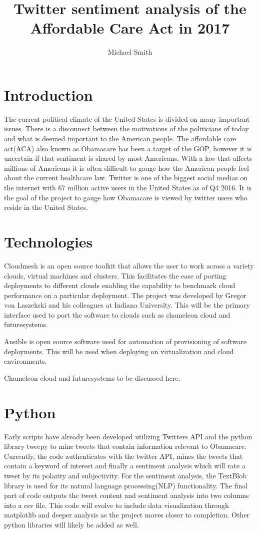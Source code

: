 \documentclass[9pt,twocolumn,twoside]{../../styles/osajnl}
\title{Twitter sentiment analysis of the Affordable Care Act in 2017}
\author[1]{Michael Smith}
\affil[1]{School of Informatics and Computing, Bloomington, IN 47408, U.S.A.}
\affil[*]{Corresponding authors: mls35@iu.edu}
\begin{document}
\maketitle

\section{Introduction}
The current political climate of the United States is divided on many important issues.  There is a disconnect between the motivations of the politicians of today and what is deemed important to the American people.  The affordable care act(ACA) also known as Obamacare has been a target of the GOP, however it is uncertain if that sentiment is shared by most Americans.  With a law that affects millions of Americans it is often difficult to gauge how the American people feel about the current healthcare law.  Twitter is one of the biggest social medias on the internet with 67 million active users in the United States as of Q4 2016.\cite{www-statista}  It is the goal of the project to gauge how Obamacare is viewed by twitter users who reside in the United States.  

\section{Technologies}

Cloudmesh is an open source toolkit that allows the user to work across a variety clouds, virtual machines and clusters.  This facilitates the ease of porting deployments to different clouds enabling the capability to benchmark cloud performance on a particular deployment. \cite{www-cloudmesh}  The project was developed by Gregor von Laszekski and his colleagues at Indiana University.  This will be the primary interface used to port the software to clouds such as chameleon cloud and futuresystems.

Ansible is open source software used for automation of provisioning of software deployments.  This will be used when deploying on virtualization and cloud environments.

Chameleon cloud and futuresystems to be discussed here.

\section{Python}

Early scripts have already been developed utilizing Twitters API and the python library tweepy to mine tweets that contain information relevant to Obamacare. Currently, the code authenticates with the twitter API, mines the tweets that contain a keyword of interest and finally a sentiment analysis which will rate a tweet by its polarity and subjectivity.  For the sentiment analysis, the TextBlob library is used for its natural language processing(NLP) functionality. The final part of code outputs the tweet content and sentiment analysis into two columns into a csv file.
This code will evolve to include data visualization through matplotlib and deeper analysis as the project moves closer to completion.  Other python libraries will likely be added as well.
\end{document}
